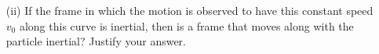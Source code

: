 \documentclass[12pt]{article}
\begin{document}
\begin{enumerate}
\begin{enumerate}
        \item[(ii)] If the frame in which the motion is observed to have this constant speed \( v_0 \) along this curve is inertial, then is a frame that moves along with the particle inertial? Justify your answer.
    \end{enumerate}
\end{enumerate}
\end{document}

